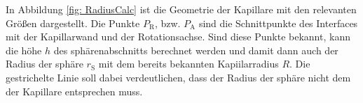 In Abbildung \ref*{fig: RadiusCalc} ist die Geometrie der Kapillare mit den relevanten Größen dargestellt. Die Punkte $P_{\mathrm{R}}$, bzw. $P_{\mathrm{A}}$ sind die Schnittpunkte des Interfaces mit der Kapillarwand und der Rotationsachse. Sind diese Punkte bekannt, kann die höhe $h$ des sphärenabschnitts berechnet werden und damit dann auch der Radius der sphäre $r_{\mathrm{S}}$ mit dem bereits bekannten Kapiilarradius $R$. Die gestrichelte Linie soll dabei verdeutlichen, dass der Radius der sphäre nicht dem der Kapillare entsprechen muss. 






